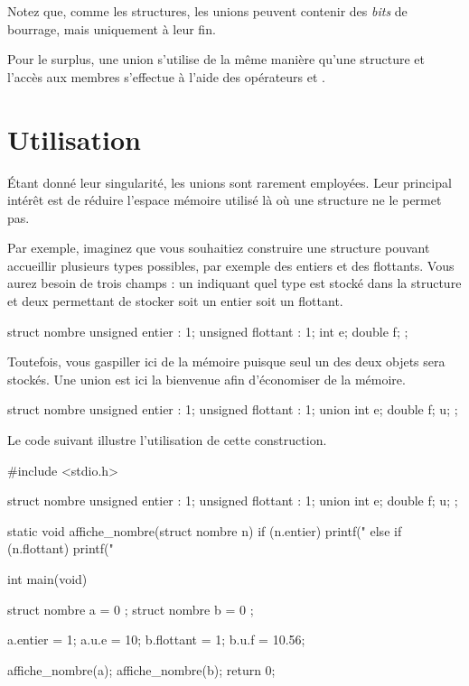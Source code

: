\begin{infobox}
  Notez que, comme les structures, les
unions peuvent contenir des \emph{bits} de bourrage, mais uniquement à
leur fin.
\end{infobox}


Pour le surplus, une union s'utilise de la même manière qu'une structure
et l'accès aux membres s'effectue à l'aide des opérateurs  et
\mybox{-\textgreater{}}.

\section{Utilisation }
\label{utilisation-5}

Étant donné leur singularité, les unions sont rarement employées. Leur 
principal intérêt est de réduire l'espace mémoire utilisé là où une 
structure ne le permet pas.

Par exemple, imaginez que vous souhaitiez construire une structure
pouvant accueillir plusieurs types possibles, par exemple des entiers et
des flottants. Vous aurez besoin de trois champs : un indiquant quel
type est stocké dans la structure et deux permettant de stocker soit un
entier soit un flottant.

\begin{C}
struct nombre
{
    unsigned entier : 1;
    unsigned flottant : 1;
    int e;
    double f;
};
\end{C}

Toutefois, vous gaspiller ici de la mémoire puisque seul un des deux
objets sera stockés. Une union est ici la bienvenue afin d'économiser de
la mémoire.

\begin{C}
struct nombre
{
    unsigned entier : 1;
    unsigned flottant : 1;
    union
    {
        int e;
        double f;
    } u;
};
\end{C}

Le code suivant illustre l'utilisation de cette construction.

\begin{C}
#include <stdio.h>

struct nombre
{
    unsigned entier : 1;
    unsigned flottant : 1;
    union
    {
        int e;
        double f;
    } u;
};


static void affiche_nombre(struct nombre n)
{
    if (n.entier)
        printf("%
    else if (n.flottant)
        printf("%
}


int main(void)
{
    struct nombre a = { 0 };
    struct nombre b = { 0 };

    a.entier = 1;
    a.u.e = 10;
    b.flottant = 1;
    b.u.f = 10.56;

    affiche_nombre(a);
    affiche_nombre(b);
    return 0;
}
\end{C}

